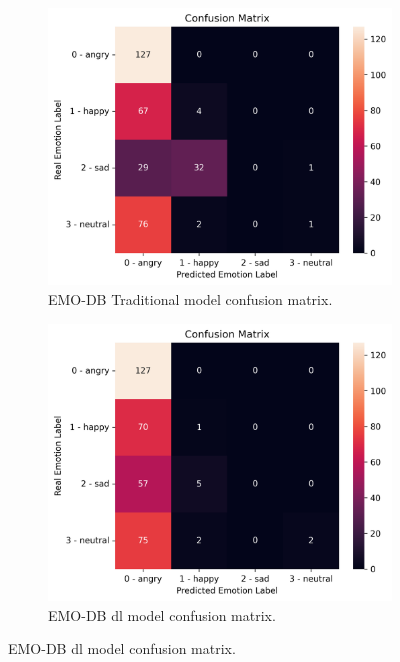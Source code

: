 \begin{figure}
	\newline
	\begin{subfigure}{.5\textwidth}
		\centering
		\includegraphics[width=\linewidth]{figs/4_5_discussion/emo_trad_cm.png}
		\caption{EMO-DB Traditional model confusion matrix.}
	\end{subfigure}%
	\begin{subfigure}{.5\textwidth}
		\centering
		\includegraphics[width=\linewidth]{figs/4_5_discussion/emo_deep_cm.png}
		\caption{EMO-DB \ac{dl} model confusion matrix.}
	\end{subfigure}
	\newline

\end{figure}
